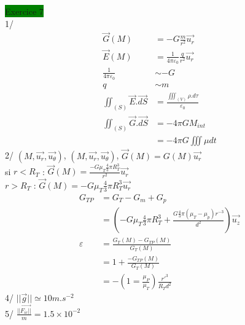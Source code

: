\documentclass[a4paper]{article}
\begin{document}
\noindent \colorbox{green}{Exercice 7}\\
1/ \begin{align*}
    \vec{G}(M) &= -G \frac{m}{r^2}\vec{u_r}\\
    \vec{E}(M) &= \frac{1}{4\pi \varepsilon_0}\frac{q}{r^2} \vec{u_r}\\
    \frac{1}{4\pi \varepsilon_0} &\sim -G \\
    q &\sim m \\
    \iint_{(S)} \vec{E}.\vec{dS} &= \frac{\iiint_{(V)} \rho.d\tau}{\varepsilon_0}\\
    \iint_{(S)} \vec{G}.\vec{dS} &= -4\pi GM_{int} \\
    &= -4\pi G \iiint \mu dt
\end{align*}
2/ \((M, \vec{u_r}, \vec{u_\theta})\), \((M, \vec{u_r}, \vec{u_\theta})\), \(\vec{G}(M) = G(M)\vec{u_r}\)\\
si \(r < R_T\) : \(\vec{G}(M) = \frac{-G\mu_T \frac{4}{3}\pi R_T^3}{r^2}\vec{u_r}\)\\
\(r > R_T\) :  \(\vec{G}(M) = -G\mu_T \frac{4}{3}\pi R_T^3\vec{u_r}\)\\
\begin{align*}
    G_{TP} &= G_T - G_m + G_p\\
    &= (-G\mu_T \frac{4}{3}\pi R_T^3 + \frac{G\frac{4}{3}\pi(\mu_T - \mu_p) r^{-3}}{d^2})\vec{u_z}\\
    \varepsilon &= \frac{G_T(M)-G_{TP}(M)}{G_T(M)}\\
    &= 1 + \frac{-G_{TP}(M)}{G_T(M)}\\
    &= - (1=\frac{\mu_P}{\mu_T})\frac{r'^3}{R_T d^2}
\end{align*}
4/ \(||\vec{g}|| \simeq 10 m.s^{-2}\)\\
5/ \(\frac{||\vec{F_{ic}||}}{m} = 1.5 \times 10^{-2}\) 
\end{document}
